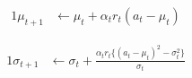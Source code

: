 \documentclass{article}
\begin{document}
\begin{alignat*}{1}
\mu_{t+1} & \leftarrow\mu_{t}+\alpha_{t}r_{t}(a_{t}-\mu_{t})
\end{alignat*}

\begin{alignat*}{1}
\sigma_{t+1} & \leftarrow\sigma_{t}+\frac{\alpha_{t}r_{t}\{(a_{t}-\mu_{t})^{2}-\sigma_{t}^{2}\}}{\sigma_{t}}
\end{alignat*}


\begin{comment}
\newpage
\section{Question Answer}
\begin{figure}[htb!]
\end{figure}
\newpage
\section{Question Answer}
Plots of Histogram
\subsection{Answer }
\end{comment}
\end{document}
